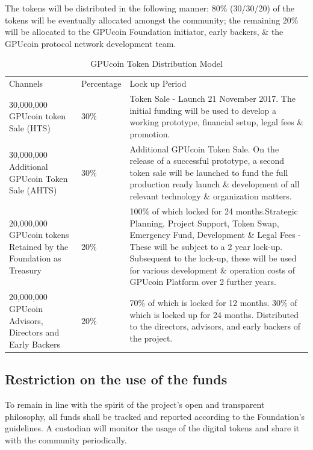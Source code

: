 \documentclass{article}
\begin{document}
 The tokens will be distributed in the following manner:
80\% (30/30/20) of the tokens will be eventually allocated amongst the community; the remaining 20\% will be allocated to the GPUcoin Foundation initiator, early backers, \& the GPUcoin protocol network development team.


\begin{table}[!htb]
\centering
\begin{tabular}{ |p{2.8cm}|p{2.5cm}|p{5cm}|}
\hline
\rowcolor{lightgray} \multicolumn{3}{|c|}{GPUcoin Token Distribution Model} \\
\hline
Channels & Percentage & Lock up Period \\
\hline
30,000,000 GPUcoin token Sale (HTS) & 30\% & Token Sale - Launch 21 November 2017. The initial funding will be used to develop a working prototype, financial setup, legal fees \& promotion.
 \\
 \hline
30,000,000 Additional GPUcoin Token Sale (AHTS) & 30\% & Additional GPUcoin Token Sale. On the release of a successful prototype, a second token sale will be launched to fund the full production ready launch \& development of all relevant technology \& organization matters.
\\
\hline
20,000,000 GPUcoin tokens Retained by the Foundation as Treasury & 20\% & 100\% of which locked for 24 months.Strategic Planning, Project Support, Token Swap, Emergency Fund, Development \& Legal Fees - These will be subject to a 2 year lock-up. Subsequent to the lock-up, these will be used for various development \& operation costs of GPUcoin Platform over 2 further years.
\\
\hline
20,000,000 GPUcoin Advisors, Directors and Early Backers & 20\% & 70\% of which is locked for 12 months. 30\% of which is locked up for 24 months. Distributed to the directors, advisors, and early backers of the
 project.
\\
 \hline
\end{tabular}
\caption{GPUcoin Token Distribution Model}
\label{table:hoot_token_distribution_model}
\end{table}

\subsection{Restriction on the use of the funds} %
\label{sub:restriction_on_the_use_of_the_funds}
To remain in line with the spirit of the project’s open and transparent philosophy, all funds shall be tracked and reported according to the Foundation’s guidelines. A custodian will monitor the usage of the digital tokens and share it with the community periodically.
\end{document}
